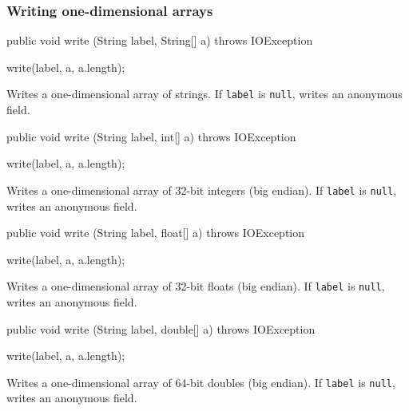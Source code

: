 \subsubsection*{Writing one-dimensional arrays}
\begin{code}

   public void write (String label, String[] a) throws IOException \begin{hide} {
      write(label, a, a.length);
   }
   \end{hide}\end{code}
\begin{tabb}
Writes a one-dimensional array of strings.
If \texttt{label} is \texttt{null}, writes an anonymous field.
\end{tabb}
\begin{code}
    
   public void write (String label, int[] a) throws IOException \begin{hide} {
      write(label, a, a.length);
   }
   \end{hide}\end{code}
\begin{tabb}
Writes a one-dimensional array of 32-bit integers (big endian).
If \texttt{label} is \texttt{null}, writes an anonymous field.
\end{tabb}
\begin{code}
    
   public void write (String label, float[] a) throws IOException \begin{hide} {
      write(label, a, a.length);
   }
   \end{hide}\end{code}
\begin{tabb}
Writes a one-dimensional array of 32-bit floats (big endian).
If \texttt{label} is \texttt{null}, writes an anonymous field.
\end{tabb}
\begin{code}
    
   public void write (String label, double[] a) throws IOException \begin{hide} {
      write(label, a, a.length);
   }
   \end{hide}\end{code}
\begin{tabb}
Writes a one-dimensional array of 64-bit doubles (big endian).
If \texttt{label} is \texttt{null}, writes an anonymous field.
\end{tabb}


\begin{code}\begin{hide}
}
\end{hide}\end{code}
